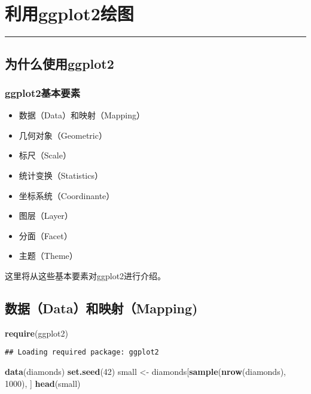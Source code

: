 \documentclass[]{article}
\title{}
\author{}
\date{}
\newenvironment{Shaded}{\begin{snugshade}}{\end{snugshade}}
\newcommand{\KeywordTok}[1]{\textcolor[rgb]{0.13,0.29,0.53}{\textbf{#1}}}
\newcommand{\DecValTok}[1]{\textcolor[rgb]{0.00,0.00,0.81}{#1}}
\newcommand{\StringTok}[1]{\textcolor[rgb]{0.31,0.60,0.02}{#1}}
\newcommand{\NormalTok}[1]{#1}
\providecommand{\tightlist}{%
  \setlength{\itemsep}{0pt}\setlength{\parskip}{0pt}}
\begin{document}
{
\setcounter{tocdepth}{2}
\tableofcontents
}
\section{利用ggplot2绘图}\label{ggplot2}

\begin{center}\rule{0.5\linewidth}{\linethickness}\end{center}

\subsection{为什么使用ggplot2}\label{ggplot2}

\subsubsection{ggplot2基本要素}\label{ggplot2}

\begin{itemize}
\tightlist
\item
  数据（Data）和映射（Mapping）
\item
  几何对象（Geometric）
\item
  标尺（Scale）
\item
  统计变换（Statistics）
\item
  坐标系统（Coordinante）
\item
  图层（Layer）
\item
  分面（Facet）
\item
  主题（Theme）
\end{itemize}

这里将从这些基本要素对ggplot2进行介绍。

\subsection{数据（Data）和映射（Mapping)}\label{datamapping}

\begin{Shaded}
\begin{Highlighting}[]
\KeywordTok{require}\NormalTok{(ggplot2)}
\end{Highlighting}
\end{Shaded}

\begin{verbatim}
## Loading required package: ggplot2
\end{verbatim}

\begin{Shaded}
\begin{Highlighting}[]
\KeywordTok{data}\NormalTok{(diamonds)}
\KeywordTok{set.seed}\NormalTok{(}\DecValTok{42}\NormalTok{)}
\NormalTok{small <-}\StringTok{ }\NormalTok{diamonds[}\KeywordTok{sample}\NormalTok{(}\KeywordTok{nrow}\NormalTok{(diamonds), }\DecValTok{1000}\NormalTok{), ]}
\KeywordTok{head}\NormalTok{(small)}
\end{Highlighting}
\end{Shaded}
\end{document}
